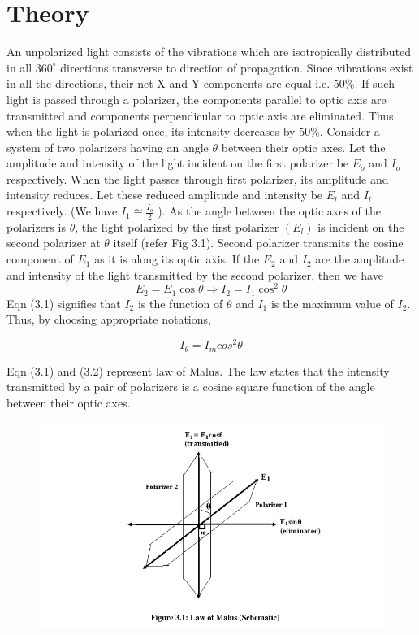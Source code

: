 \documentclass[11pt]{article}
\begin{document}
	
	\section{Theory}

 An unpolarized light consists of the vibrations which are isotropically distributed in all $360^{\circ}$ directions transverse to direction of propagation. Since vibrations exist in all the directions, their net $\mathrm{X}$ and $\mathrm{Y}$ components are equal i.e. $50 \%$. If such light is passed through a polarizer, the components parallel to optic axis are transmitted and components perpendicular to optic axis are eliminated. Thus when the light is polarized once, its intensity decreases by $50 \%$. Consider a system of two polarizers having an angle $\theta$ between their optic axes. Let the amplitude and intensity of the light incident on the first polarizer be $E_{o}$ and $I_{o}$ respectively. When the light passes through first polarizer, its amplitude and intensity reduces. Let these reduced amplitude and intensity be $E_{l}$ and $I_{l}$ respectively. (We have $I_{1} \cong \frac{I_{o}}{2}$ ). As the angle between the optic axes of the polarizers is $\theta$, the light polarized by the first polarizer $\left(E_{l}\right)$ is incident on the second polarizer at $\theta$ itself (refer Fig 3.1). Second polarizer transmits the cosine component of $E_{1}$ as it is along its optic axis. If the $E_{2}$ and $I_{2}$ are the amplitude and intensity of the light transmitted by the second polarizer, then we have
$$
E_{2}=E_{1} \cos \theta \Rightarrow I_{2}=I_{1} \cos ^{2} \theta
$$
Eqn (3.1) signifies that $I_{2}$ is the function of $\theta$ and $I_{1}$ is the maximum value of $I_{2}$. Thus, by choosing appropriate notations,

$$ I_\theta = I_m cos^2\theta$$

Eqn (3.1) and (3.2) represent law of Malus. The law states that the intensity transmitted by a pair
of polarizers is a cosine square function of the angle between their optic axes.

	\begin{figure}[H]
		\centering
		\includegraphics[scale=0.8]{theory.png}
		\label{it}
	\end{figure}
	
\end{document}
